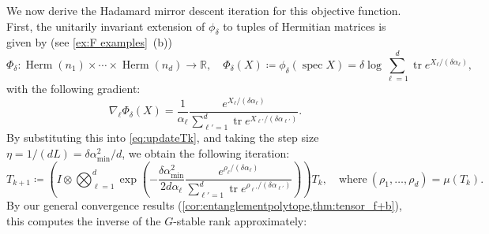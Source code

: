 \documentclass[11pt,letterpaper]{article}
\numberwithin{equation}{section}
\newcommand{\RR}{\mathbb{R}}
\DeclareMathOperator{\spec}{spec}
\DeclareMathOperator{\tr}{tr}
\DeclareMathOperator{\Herm}{Herm}
\begin{document}
We now derive the Hadamard mirror descent iteration for this objective function.
First, the unitarily invariant extension of $\phi_\delta$ to tuples of Hermitian matrices is given by (see \cref{ex:F examples}~(b))
\[
    \Phi_\delta \colon \Herm(n_1) \times \cdots \times \Herm(n_d) \to \RR, \quad
    \Phi_\delta(X) \coloneqq \phi_\delta(\spec X) = \delta\log\sum_{\ell=1}^d\tr e^{X_\ell/(\delta\alpha_\ell)},
\]
with the following gradient:
\[
    \nabla_\ell\Phi_\delta(X)
= \frac1{\alpha_\ell} \frac {e^{X_\ell/(\delta\alpha_{\ell})}} {\sum_{\ell'=1}^d\tr e^{X_{\ell'}/(\delta\alpha_{\ell'})}}.
\]
By substituting this into \cref{eq:updateTk}, and taking the step size $\eta = 1 / (d L) = \delta\alpha_{\min}^2/d$, we obtain the following iteration:
\begin{equation}\label{eq:g stable update}
    T_{k+1} \coloneqq \left(I \otimes \bigotimes_{\ell=1}^d\exp\left(-\frac{\delta\alpha_{\min}^2}{2d\alpha_\ell}\frac {e^{\rho_\ell/(\delta\alpha_{\ell})}} {\sum_{\ell'=1}^d \tr e^{\rho_{\ell'}/(\delta\alpha_{\ell'})}}\right)\right)T_k,\quad\text{where}\ (\rho_1,\dots,\rho_d) = \mu(T_k).
\end{equation}
By our general convergence results (\cref{cor:entanglementpolytope,thm:tensor_f+b}), this computes the inverse of the $G$-stable rank approximately:
\end{document}
